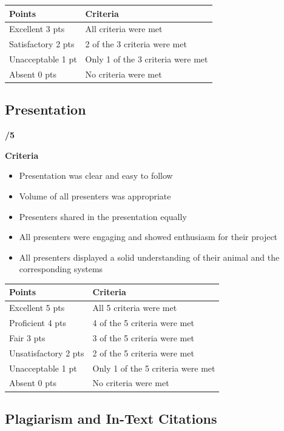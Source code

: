 \documentclass[
]{book}
\providecommand{\tightlist}{%
  \setlength{\itemsep}{0pt}\setlength{\parskip}{0pt}}
\begin{document}
\begin{longtable}[]{@{}ll@{}}
\toprule
Points & Criteria \\
\midrule
\endhead
Excellent 3 pts & All criteria were met \\
Satisfactory 2 pts & 2 of the 3 criteria were met \\
Unacceptable 1 pt & Only 1 of the 3 criteria were met \\
Absent 0 pts & No criteria were met \\
\bottomrule
\end{longtable}

\hypertarget{presentation}{%
\subsection*{Presentation}\label{presentation}}

\textbf{/5}

\textbf{Criteria}

\begin{itemize}
\tightlist
\item
  Presentation was clear and easy to follow
\item
  Volume of all presenters was appropriate
\item
  Presenters shared in the presentation equally
\item
  All presenters were engaging and showed enthusiasm for their project
\item
  All presenters displayed a solid understanding of their animal and the corresponding systems
\end{itemize}

\begin{longtable}[]{@{}ll@{}}
\toprule
Points & Criteria \\
\midrule
\endhead
Excellent 5 pts & All 5 criteria were met \\
Proficient 4 pts & 4 of the 5 criteria were met \\
Fair 3 pts & 3 of the 5 criteria were met \\
Unsatisfactory 2 pts & 2 of the 5 criteria were met \\
Unacceptable 1 pt & Only 1 of the 5 criteria were met \\
Absent 0 pts & No criteria were met \\
\bottomrule
\end{longtable}

\hypertarget{plagiarism-and-in-text-citations}{%
\subsection*{Plagiarism and In-Text Citations}\label{plagiarism-and-in-text-citations}}
\end{document}
